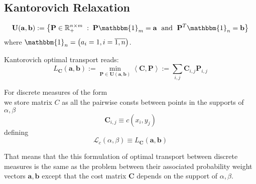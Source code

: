\subsection{Kantorovich Relaxation}

$$
\mathbf{U}(\mathbf{a}, \mathbf{b}) := \left\{
\mathbf{P} \in \mathbb{R}_{+}^{n\times m} \; : \;
\mathbf{P} \mathbbm{1}_{m} = \mathbf{a}
\; \text { and } \;
\mathbf{P}^{T} \mathbbm{1}_{n} = \mathbf{b}
\right\}
$$
where $ \mathbbm{1}_{n} = \begin{pmatrix} a_{i} = 1, i = \overline{1, n} \end{pmatrix} $.

Kantorovich optimal transport reads:
$$
L_{\mathbf{C}}(\mathbf{a}, \mathbf{b}) :=
\min_{\mathbf{P} \in \mathbf{U}(\mathbf{a}, \mathbf{b})}
\left< \mathbf{C}, \mathbf{P} \right> :=
\sum_{i, j} \mathbf{C}_{i,j} \mathbf{P}_{i,j}
$$

For discrete measures of the form
\[  \] 
we store matrix $C$ as all the pairwise consts between points in the supports of $\alpha, \beta$
\[ \mathbf{C}_{i,j} \equiv c(x_{i}, y_{j}) \]
defining
\[ \mathcal{L}_{c}(\alpha, \beta) \equiv L_{\mathbf{C}} (\mathbf{a}, \mathbf{b}) \] 

That means that the this formulation of optimal transport between discrete measures is the same as the
problem between their associated probability weight vectors
$\mathbf{a}, \mathbf{b}$ except that the cost matrix $\mathbf{C}$
depends on the support of $\alpha, \beta$.
